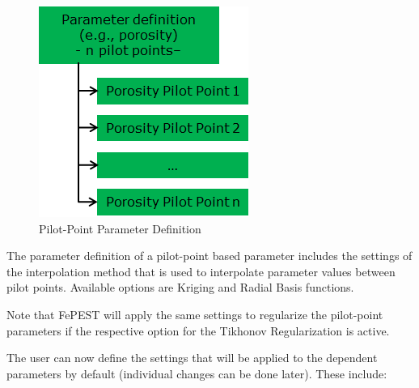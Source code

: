 \begin{itemize}
\begin{figure}
	\center
	\includegraphics[width=0.7\columnwidth]{figureFundamentalSetup/ParameterDefintionsPpoits.png}
\caption{Pilot-Point Parameter Definition}
\label{fig:fepest:ParameterDefintionsPpoits}
\end{figure}

The parameter definition of a pilot-point based parameter includes the settings of the interpolation method that is used to interpolate parameter values between pilot points. Available options are Kriging and Radial Basis functions. 

Note that FePEST will apply the same settings to regularize the pilot-point parameters if the respective option for the Tikhonov Regularization is active.

\end{itemize}

The user can now define the settings that will be applied to the dependent parameters by default (individual changes can be done later). These include:

